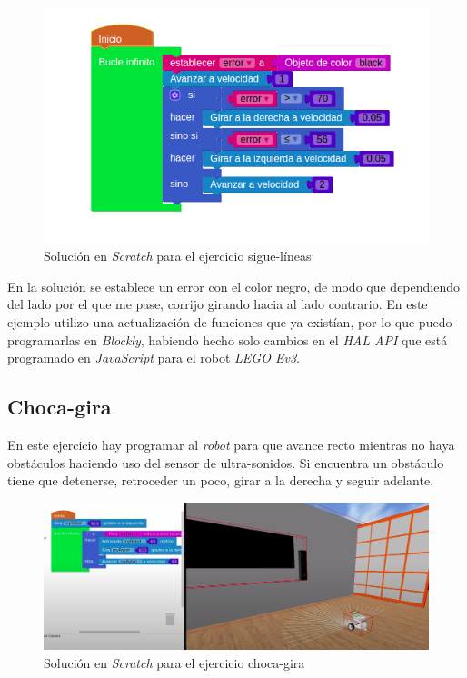         \begin{figure}[H]
    \centering
    \includegraphics[scale=0.5]{img/solucion.png}
    \caption{Solución en \textit{Scratch} para el ejercicio sigue-líneas} 
    \label{fig:solucion}
    \end{figure}
    
En la solución se establece un error con el color negro, de modo que dependiendo del lado por el que me pase, corrijo girando hacia al lado contrario. En este ejemplo utilizo una actualización de funciones que ya existían, por lo que puedo programarlas en \textit{Blockly}, habiendo hecho solo cambios en el \textit{HAL API} que está programado en \textit{JavaScript} para el robot \textit{LEGO Ev3}.
    
    
\subsection{Choca-gira}
\label{subsec:chocagira}
En este ejercicio hay programar al \textit{robot} para que avance recto mientras no haya obstáculos haciendo uso del sensor de ultra-sonidos. Si encuentra un obstáculo tiene que detenerse, retroceder un poco, girar a la derecha y seguir adelante.


    \begin{figure}[H]
    \centering
    \includegraphics[scale=0.25]{img/chocagira.png}
    \caption{Solución en \textit{Scratch} para el ejercicio choca-gira} 
    \label{fig:chocagira}
    \end{figure}
    
